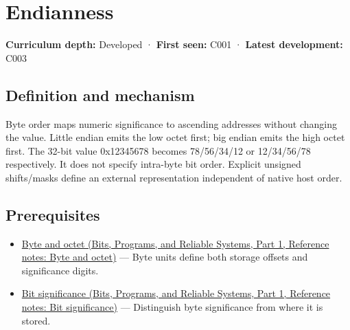 \hypertarget{appendix-bc07c3d25b18}{}\label{referencestart:appendix-bc07c3d25b18}
\section{Endianness}\label{appendix-bc07c3d25b18-endianness}

\hypertarget{appendix-bc07c3d25b18-endianness}{}

\textbf{Curriculum depth:} Developed · \textbf{First seen:} C001 · \textbf{Latest development:} C003

\begin{allmightroledefinition}

\subsection{Definition and mechanism}\label{appendix-bc07c3d25b18-definition-and-mechanism}

\hypertarget{appendix-bc07c3d25b18-definition-and-mechanism}{}

Byte order maps numeric significance to ascending addresses without changing the value. Little endian emits the low octet first; big endian emits the high octet first. The 32-bit value 0x12345678 becomes 78/56/34/12 or 12/34/56/78 respectively. It does not specify intra-byte bit order. Explicit unsigned shifts/masks define an external representation independent of native host order.

\end{allmightroledefinition}

\subsection{Prerequisites}\label{appendix-bc07c3d25b18-prerequisites}

\hypertarget{appendix-bc07c3d25b18-prerequisites}{}

\begin{itemize}
\tightlist
\item
  \href{../01-Bits-Programs-and-Reliable-Systems-P01/main.pdf\#appendix-5bee2df85484}{Byte and octet (Bits, Programs, and Reliable Systems, Part 1, Reference notes: Byte and octet)} --- Byte units define both storage offsets and significance digits.
\item
  \href{../01-Bits-Programs-and-Reliable-Systems-P01/main.pdf\#appendix-280445746493}{Bit significance (Bits, Programs, and Reliable Systems, Part 1, Reference notes: Bit significance)} --- Distinguish byte significance from where it is stored.
\end{itemize}

